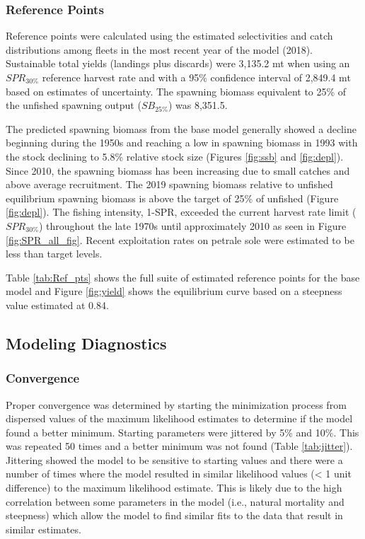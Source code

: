 \documentclass[12pt,]{article}
\begin{document}
\subsubsection{Reference Points}\label{reference-points-1}

Reference points were calculated using the estimated selectivities and
catch distributions among fleets in the most recent year of the model
(2018). Sustainable total yields (landings plus discards) were 3,135.2
mt when using an \(SPR_{30\%}\) reference harvest rate and with a 95\%
confidence interval of 2,849.4 mt based on estimates of uncertainty. The
spawning biomass equivalent to 25\% of the unfished spawning output
(\(SB_{25\%}\)) was 8,351.5.

The predicted spawning biomass from the base model generally showed a
decline beginning during the 1950s and reaching a low in spawning
biomass in 1993 with the stock declining to 5.8\% relative stock size
(Figures \ref{fig:ssb} and \ref{fig:depl}). Since 2010, the spawning
biomass has been increasing due to small catches and above average
recruitment. The 2019 spawning biomass relative to unfished equilibrium
spawning biomass is above the target of 25\% of unfished (Figure
\ref{fig:depl}). The fishing intensity, 1-SPR, exceeded the current
harvest rate limit (\(SPR_{30\%}\)) throughout the late 1970s until
approximately 2010 as seen in Figure \ref{fig:SPR_all_fig}. Recent
exploitation rates on petrale sole were estimated to be less than target
levels.

Table \ref{tab:Ref_pts} shows the full suite of estimated reference
points for the base model and Figure \ref{fig:yield} shows the
equilibrium curve based on a steepness value estimated at 0.84.

\subsection{Modeling Diagnostics}\label{modeling-diagnostics}

\subsubsection{Convergence}\label{convergence}

Proper convergence was determined by starting the minimization process
from dispersed values of the maximum likelihood estimates to determine
if the model found a better minimum. Starting parameters were jittered
by 5\% and 10\%. This was repeated 50 times and a better minimum was not
found (Table \ref{tab:jitter}). Jittering showed the model to be
sensitive to starting values and there were a number of times where the
model resulted in similar likelihood values (\textless{} 1 unit
difference) to the maximum likelihood estimate. This is likely due to
the high correlation between some parameters in the model (i.e., natural
mortality and steepness) which allow the model to find similar fits to
the data that result in similar estimates.
\end{document}
